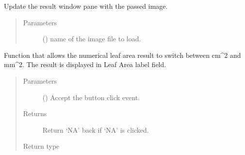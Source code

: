 \documentclass[letterpaper,10pt,english]{sphinxmanual}
\begin{document}
\begin{fulllineitems}
\begin{fulllineitems}
\end{fulllineitems}


\begin{fulllineitems}
\label{\detokenize{pyleaf.leaf_area_calculator_gui:pyleaf.leaf_area_calculator_gui.LeafAreaCalculatorGUI.change_result_preview}}
Update the result window pane with the passed image.
\begin{quote}\begin{description}
\item[{Parameters}] \leavevmode
{} () \textendash{} name of the image file to load.

\end{description}\end{quote}

\end{fulllineitems}


\begin{fulllineitems}
\label{\detokenize{pyleaf.leaf_area_calculator_gui:pyleaf.leaf_area_calculator_gui.LeafAreaCalculatorGUI.change_unit}}
Function that allows the numerical leaf area result to switch between cm\textasciicircum{}2 and mm\textasciicircum{}2.
The result is displayed in Leaf Area label field.
\begin{quote}\begin{description}
\item[{Parameters}] \leavevmode
{} () \textendash{} Accept the button click event.

\item[{Returns}] \leavevmode
Return ‘NA’ back if ‘NA’ is clicked.

\item[{Return type}] \leavevmode
{}


\end{description}
\end{quote}
\end{fulllineitems}
\end{fulllineitems}
\end{document}

